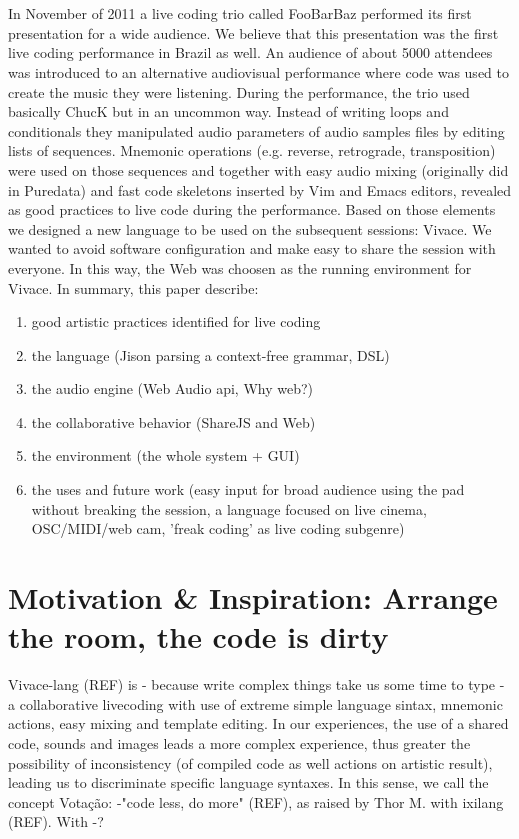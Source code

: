 \documentclass[letterpaper, 12pt]{article}
\begin{document}
\section*{} %
In November of 2011 a live coding trio called FooBarBaz performed its first presentation for a wide audience. We believe that this presentation was the first live coding performance in Brazil as well. An audience of about 5000 attendees was introduced to an alternative audiovisual performance where code was used to create the music they were listening.
During the performance, the trio used basically ChucK but in an uncommon way. Instead of writing loops and conditionals they manipulated audio parameters of audio samples files by editing lists of sequences. Mnemonic operations (e.g. reverse, retrograde, transposition) were used on those sequences and together with easy audio mixing (originally did in Puredata) and fast code skeletons inserted by Vim and Emacs editors, revealed as good practices to live code during the performance.
Based on those elements we designed a new language to be used on the subsequent sessions: Vivace. We wanted to avoid software configuration and make easy to share the session with everyone. In this way, the Web was choosen as the running environment for Vivace.
In summary, this paper describe:
\begin{enumerate}
  \item good artistic practices identified for live coding
  \item the language (Jison parsing a context-free grammar, DSL)
  \item the audio engine (Web Audio api, Why web?)
  \item the collaborative behavior (ShareJS and Web)
  \item the environment (the whole system + GUI)
  \item the uses and future work (easy input for broad audience using
    the pad without breaking the session, a language focused on live
    cinema, OSC/MIDI/web cam, 'freak coding' as live coding subgenre)
\end{enumerate}
\parskip 18pt
\section{Motivation \& Inspiration: Arrange the room, the code is dirty}
    Vivace-lang (REF) is - because write complex things take us some time to type -  a collaborative livecoding  with use of extreme simple language sintax, mnemonic actions, easy mixing and template editing. In our experiences, the use of a shared code, sounds and images leads a more complex experience,  thus greater the possibility of inconsistency (of compiled code as well actions on artistic result), leading us to discriminate specific language syntaxes. In this sense, we call the concept 
    Votação:
    -"code less, do more" (REF), as raised by Thor M. with ixilang (REF). With 
    -?
\end{document}
